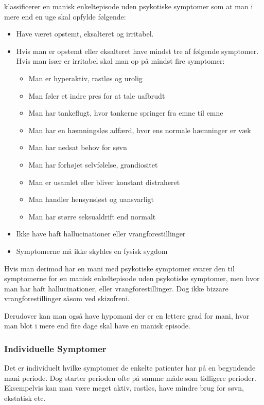 \citet{misc:netpsykmani} klassificerer en manisk enkeltepisode uden psykotiske symptomer som at man i mere end en uge skal opfylde følgende:
\begin{itemize}
	\item Have været opstemt, eksalteret og irritabel.
	\item Hvis man er opstemt eller eksalteret have mindst tre af følgende symptomer. Hvis man især er irritabel skal man op på mindst fire symptomer:
	\begin{itemize}
		\item Man er hyperaktiv, rastløs og urolig
		\item Man føler et indre pres for at tale uafbrudt
		\item Man har tankeflugt, hvor tankerne springer fra emne til emne
		\item Man har en hæmningsløs adfærd, hvor ens normale hæmninger er væk
		\item Man har nedsat behov for søvn
		\item Man har forhøjet selvfølelse, grandiositet
		\item Man er usamlet eller bliver konstant distraheret
		\item Man handler hensynsløst og uansvarligt
		\item Man har større seksualdrift end normalt
	\end{itemize}
	\item Ikke have haft hallucinationer eller vrangforestillinger
	\item Symptomerne må ikke skyldes en fysisk sygdom
\end{itemize}
Hvis man derimod har en mani med psykotiske symptomer svarer den til symptomerne for en manisk enkeltepisode uden psykotiske symptomer, men hvor man har haft hallucinationer, eller vrangforestillinger. Dog ikke bizzare vrangforestillinger såsom ved skizofreni.

Derudover kan man også have hypomani der er en lettere grad for mani, hvor man blot i mere end fire dage skal have en manisk episode.

\subsubsection{Individuelle Symptomer}
Det er individuelt hvilke symptomer de enkelte patienter har på en begyndende mani periode.
Dog starter perioden ofte på samme måde som tidligere perioder.
Eksempelvis kan man være meget aktiv, rastløs, have mindre brug for søvn, ekstatisk etc.

